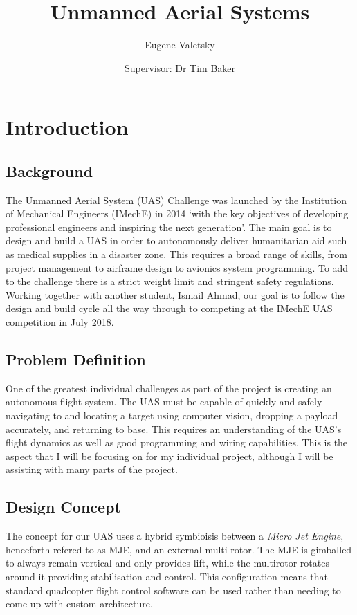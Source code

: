 \documentclass[11pt]{article}
\title{\vspace{-4em}Unmanned Aerial Systems}
\author{Eugene Valetsky\\ \and Supervisor: Dr Tim Baker}
\date{}
\begin{document}
\maketitle

\section{Introduction}
\subsection{Background}
The Unmanned Aerial System (UAS) Challenge was launched by the Institution of Mechanical Engineers (IMechE) in 2014 `with the key objectives of developing professional engineers and inspiring the next generation'\cite{IMechE_about_uas}. The main goal is to design and build a UAS in order to autonomously deliver humanitarian aid such as medical supplies in a disaster zone. This requires a broad range of skills, from project management to airframe design to avionics system programming. To add to the challenge there is a strict weight limit and stringent safety regulations. Working together with another student, Ismail Ahmad, our goal is to follow the design and build cycle all the way through to competing at the IMechE UAS competition in July 2018.

\subsection{Problem Definition}
One of the greatest individual challenges as part of the project is creating an autonomous flight system. The UAS must be capable of quickly and safely navigating to and locating a target using computer vision, dropping a payload accurately, and returning to base. This requires an understanding of the UAS’s flight dynamics as well as good programming and wiring capabilities. This is the aspect that I will be focusing on for my individual project, although I will be assisting with many parts of the project.

\subsection{Design Concept}
The concept for our UAS uses a hybrid symbioisis between a \emph{Micro Jet Engine}, henceforth refered to as MJE, and an external multi-rotor. The MJE is gimballed to always remain vertical and only provides lift, while the multirotor rotates around it providing stabilisation and control. This configuration means that standard quadcopter flight control software can be used rather than needing to come up with custom architecture.
\end{document}
